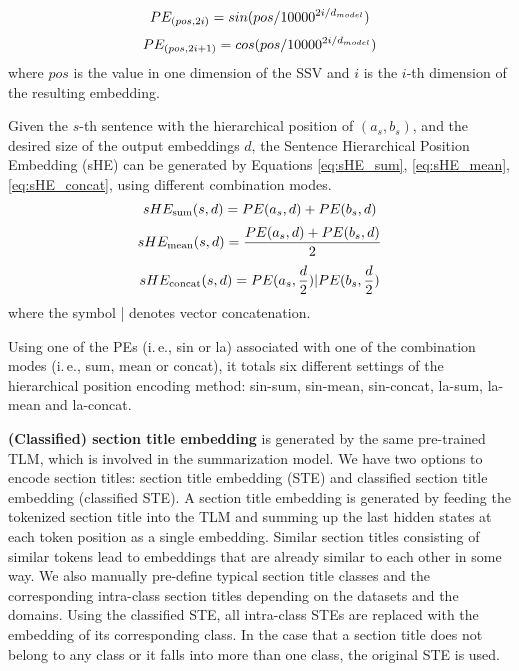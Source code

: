 \documentclass[11pt]{article}
\begin{document}
\begin{equation}\label{eq:sinusoid1}
\footnotesize
PE_{(pos, 2i)} =sin(pos/10000^{2i/d_{model}})
\end{equation}
\begin{equation}\label{eq:sinusoid2}
\footnotesize
PE_{(pos, 2i+1)} =cos(pos/10000^{2i/d_{model}})
\end{equation}
\noindent
where $pos$ is the value in one dimension of the SSV and $i$ is the $i$-th dimension of the resulting embedding.




Given the $s$-th sentence with the hierarchical position of $(a_s,b_s)$, and the desired size of the output embeddings $d$, the Sentence Hierarchical Position
Embedding (sHE) can be generated by Equations \ref{eq:sHE_sum}, \ref{eq:sHE_mean}, \ref{eq:sHE_concat}, using different combination modes. 
\begin{equation} 
\label{eq:sHE_sum}
\footnotesize
sHE_{\text{sum}} (s, d) = PE(a_s, d) \\
+ PE(b_s, d)
\end{equation}
\begin{equation}
\footnotesize
\label{eq:sHE_mean}
sHE_{\text{mean}} (s, d) = \frac{PE(a_s, d) + PE(b_s, d)}{2}
\end{equation}
\begin{equation}
\footnotesize
\label{eq:sHE_concat}
sHE_{\text{concat}} (s, d) = PE(a_s,\frac{d}{2})  |  PE(b_s,\frac{d}{2}) 
\end{equation}
where the symbol | denotes vector concatenation.

Using one of the PEs (i.\,e., sin or la) associated with one of the combination modes (i.\,e., sum, mean or concat), it totals six different settings of the hierarchical position encoding method: sin-sum, sin-mean, sin-concat, la-sum, la-mean and la-concat. 


\textbf{(Classified) section title embedding} is generated by the same pre-trained TLM, which is involved in the summarization model. We have two options to encode section titles: section title embedding (STE) and classified section title embedding (classified STE). 
A section title embedding is generated by feeding the tokenized section title into the TLM and summing up the last hidden states at each token position as a single embedding. Similar section titles consisting of similar tokens lead to embeddings that are already similar to each other in some way. We also manually pre-define typical section title classes and the corresponding intra-class section titles depending on the datasets and the domains. Using the classified STE, all intra-class STEs are replaced with the embedding of its corresponding class. In the case that a section title does not belong to any class or it falls into more than one class, the original STE is used.  
\end{document}
